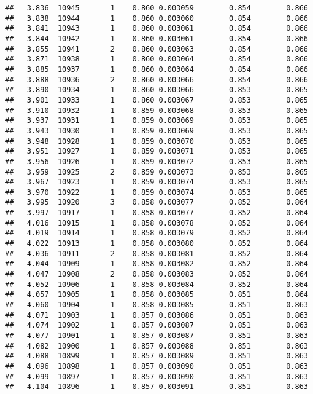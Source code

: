 \documentclass[
]{book}
\begin{document}
\begin{verbatim}
##   3.836  10945       1    0.860 0.003059        0.854        0.866
##   3.838  10944       1    0.860 0.003060        0.854        0.866
##   3.841  10943       1    0.860 0.003061        0.854        0.866
##   3.844  10942       1    0.860 0.003061        0.854        0.866
##   3.855  10941       2    0.860 0.003063        0.854        0.866
##   3.871  10938       1    0.860 0.003064        0.854        0.866
##   3.885  10937       1    0.860 0.003064        0.854        0.866
##   3.888  10936       2    0.860 0.003066        0.854        0.866
##   3.890  10934       1    0.860 0.003066        0.853        0.865
##   3.901  10933       1    0.860 0.003067        0.853        0.865
##   3.910  10932       1    0.859 0.003068        0.853        0.865
##   3.937  10931       1    0.859 0.003069        0.853        0.865
##   3.943  10930       1    0.859 0.003069        0.853        0.865
##   3.948  10928       1    0.859 0.003070        0.853        0.865
##   3.951  10927       1    0.859 0.003071        0.853        0.865
##   3.956  10926       1    0.859 0.003072        0.853        0.865
##   3.959  10925       2    0.859 0.003073        0.853        0.865
##   3.967  10923       1    0.859 0.003074        0.853        0.865
##   3.970  10922       1    0.859 0.003074        0.853        0.865
##   3.995  10920       3    0.858 0.003077        0.852        0.864
##   3.997  10917       1    0.858 0.003077        0.852        0.864
##   4.016  10915       1    0.858 0.003078        0.852        0.864
##   4.019  10914       1    0.858 0.003079        0.852        0.864
##   4.022  10913       1    0.858 0.003080        0.852        0.864
##   4.036  10911       2    0.858 0.003081        0.852        0.864
##   4.044  10909       1    0.858 0.003082        0.852        0.864
##   4.047  10908       2    0.858 0.003083        0.852        0.864
##   4.052  10906       1    0.858 0.003084        0.852        0.864
##   4.057  10905       1    0.858 0.003085        0.851        0.864
##   4.060  10904       1    0.858 0.003085        0.851        0.863
##   4.071  10903       1    0.857 0.003086        0.851        0.863
##   4.074  10902       1    0.857 0.003087        0.851        0.863
##   4.077  10901       1    0.857 0.003087        0.851        0.863
##   4.082  10900       1    0.857 0.003088        0.851        0.863
##   4.088  10899       1    0.857 0.003089        0.851        0.863
##   4.096  10898       1    0.857 0.003090        0.851        0.863
##   4.099  10897       1    0.857 0.003090        0.851        0.863
##   4.104  10896       1    0.857 0.003091        0.851        0.863

\end{verbatim}
\end{document}
